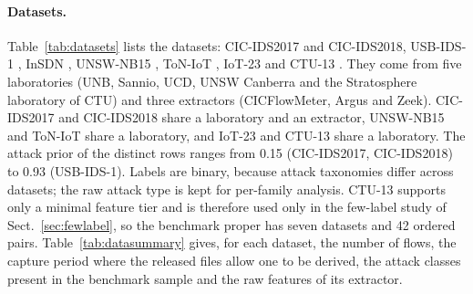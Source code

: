 \documentclass[11pt]{article}
\begin{document}
\paragraph{Datasets.}
Table~\ref{tab:datasets} lists the datasets: CIC-IDS2017 \citep{sharafaldin2018cicids} and CIC-IDS2018, USB-IDS-1 \citep{catillo2021usbids1}, InSDN \citep{elsayed2020insdn}, UNSW-NB15 \citep{moustafa2015unsw}, ToN-IoT \citep{alsaedi2020toniot}, IoT-23 \citep{garcia2020iot23} and CTU-13 \citep{garcia2014ctu13}.
They come from five laboratories (UNB, Sannio, UCD, UNSW Canberra and the Stratosphere laboratory of CTU) and three extractors (CICFlowMeter, Argus and Zeek).
CIC-IDS2017 and CIC-IDS2018 share a laboratory and an extractor, UNSW-NB15 and ToN-IoT share a laboratory, and IoT-23 and CTU-13 share a laboratory.
The attack prior of the distinct rows ranges from 0.15 (CIC-IDS2017, CIC-IDS2018) to 0.93 (USB-IDS-1).
Labels are binary, because attack taxonomies differ across datasets; the raw attack type is kept for per-family analysis.
CTU-13 supports only a minimal feature tier and is therefore used only in the few-label study of Sect.~\ref{sec:fewlabel}, so the benchmark proper has seven datasets and 42 ordered pairs.
Table~\ref{tab:datasummary} gives, for each dataset, the number of flows, the capture period where the released files allow one to be derived, the attack classes present in the benchmark sample and the raw features of its extractor.

\begin{table}[t]
\centering\small
\caption{Datasets. The attack prior is that of the distinct rows after harmonisation. CTU-13 supports only the minimal feature tier and is excluded from the seven-dataset benchmark.}\label{tab:datasets}

\end{table}

\begin{table}[t]
\centering\scriptsize
\caption{Summary of the datasets. Flows: valid labelled flows after cleaning, before the distinct-row sampling (the benchmark sample has at most 100\,000 rows). Capture period: derived from the timestamps of the released file or from the file names; ``n/a'' where the released files have none or mix timestamp formats, so no reliable range exists. Attack classes: those present in the benchmark sample, so a very rare class can be absent; names are as released (for example, ``Infilteration'' is the spelling of CIC-IDS2018). Raw features: number of columns of the released file and four examples; the benchmark uses only the 13 harmonised features of Sect.~\ref{sec:benchdata}.}\label{tab:datasummary}
\resizebox{\textwidth}{!}{}
\end{table}
\end{document}

